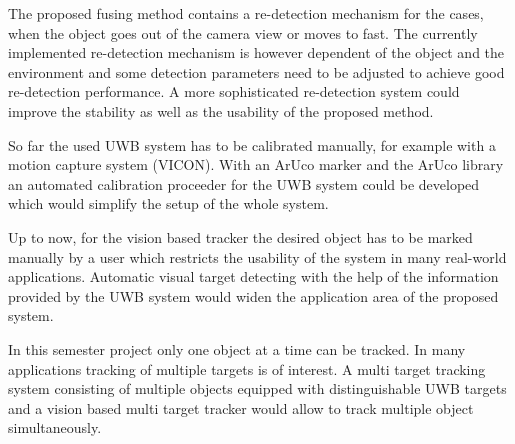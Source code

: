 The proposed fusing method contains a re-detection mechanism for the cases, when the object goes out of the camera view or moves to fast. The currently implemented re-detection mechanism is however dependent of the object and the environment and some detection parameters need to be adjusted to achieve good re-detection performance. A more sophisticated re-detection system could improve the stability as well as the usability of the proposed method.

So far the used \ac{UWB} system has to be calibrated manually, for example with a motion capture system (VICON). With an ArUco marker and the ArUco library \cite{Aruco2014} an automated calibration proceeder for the \ac{UWB} system could be developed which would simplify the setup of the whole system. 

Up to now, for the vision based tracker the desired object has to be marked manually by a user which restricts the usability of the system in many real-world applications. Automatic visual target detecting with the help of the information provided by the \ac{UWB} system would widen the application area of the proposed system.

In this semester project only one object at a time can be tracked. In many applications tracking of multiple targets is of interest. A multi target tracking system consisting of multiple objects equipped with distinguishable \ac{UWB} targets and a vision based multi target tracker would allow to track multiple object simultaneously. 
